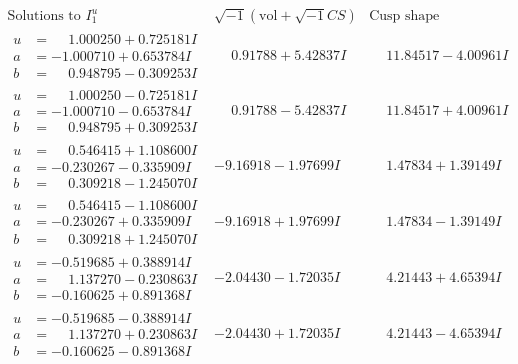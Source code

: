 \documentclass[1p]{elsarticle_modified}
\theoremstyle{definition}
\newcommand{\I}{\sqrt{-1}}
\begin{document}
$$\begin{array}{c|c|c}  
\text{Solutions to }I^u_{1}& \I (\text{vol} + \sqrt{-1}CS) & \text{Cusp shape}\\
 \hline 
\begin{aligned}
u &= \phantom{-}1.000250 + 0.725181 I \\
a &= -1.000710 + 0.653784 I \\
b &= \phantom{-}0.948795 - 0.309253 I\end{aligned}
 & \phantom{-}0.91788 + 5.42837 I & \phantom{-}11.84517 - 4.00961 I \\ \hline\begin{aligned}
u &= \phantom{-}1.000250 - 0.725181 I \\
a &= -1.000710 - 0.653784 I \\
b &= \phantom{-}0.948795 + 0.309253 I\end{aligned}
 & \phantom{-}0.91788 - 5.42837 I & \phantom{-}11.84517 + 4.00961 I \\ \hline\begin{aligned}
u &= \phantom{-}0.546415 + 1.108600 I \\
a &= -0.230267 - 0.335909 I \\
b &= \phantom{-}0.309218 - 1.245070 I\end{aligned}
 & -9.16918 - 1.97699 I & \phantom{-}1.47834 + 1.39149 I \\ \hline\begin{aligned}
u &= \phantom{-}0.546415 - 1.108600 I \\
a &= -0.230267 + 0.335909 I \\
b &= \phantom{-}0.309218 + 1.245070 I\end{aligned}
 & -9.16918 + 1.97699 I & \phantom{-}1.47834 - 1.39149 I \\ \hline\begin{aligned}
u &= -0.519685 + 0.388914 I \\
a &= \phantom{-}1.137270 - 0.230863 I \\
b &= -0.160625 + 0.891368 I\end{aligned}
 & -2.04430 - 1.72035 I & \phantom{-}4.21443 + 4.65394 I \\ \hline\begin{aligned}
u &= -0.519685 - 0.388914 I \\
a &= \phantom{-}1.137270 + 0.230863 I \\
b &= -0.160625 - 0.891368 I\end{aligned}
 & -2.04430 + 1.72035 I & \phantom{-}4.21443 - 4.65394 I \\ \hline\begin{aligned}

\end{aligned}
\end{array}$$
\end{document}
